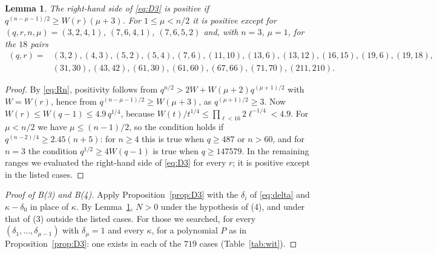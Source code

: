 \documentclass[11pt,a4paper]{amsart}
\newtheorem{lemma}[theorem]{Lemma}
\theoremstyle{remark}
\begin{document}
\begin{lemma}\label{lem:D3pos}
The right-hand side of \eqref{eq:D3} is positive if $q^{(n-\mu-1)/2}\ge W(r)(\mu+3)$. For $1\le\mu<n/2$ it is
positive except for $(q,r,n,\mu)=(3,2,4,1)$, $(7,6,4,1)$, $(7,6,5,2)$ and, with $n=3$, $\mu=1$, for the $18$
pairs
\[
\begin{aligned}
(q,r)={}&(3,2),(4,3),(5,2),(5,4),(7,6),(11,10),(13,6),(13,12),(16,15),(19,6),(19,18),\\
&(31,30),(43,42),(61,30),(61,60),(67,66),(71,70),(211,210).
\end{aligned}
\]
\end{lemma}
\begin{proof}
By \eqref{eq:Rn}, positivity follows from $q^{n/2}>2W+W(\mu+2)q^{(\mu+1)/2}$ with $W=W(r)$, hence from
$q^{(n-\mu-1)/2}\ge W(\mu+3)$, as $q^{(\mu+1)/2}\ge3$. Now $W(r)\le W(q-1)\le4.9\,q^{1/4}$, because
$W(t)/t^{1/4}\le\prod_{\ell<16}2\ell^{-1/4}<4.9$. For $\mu<n/2$ we have $\mu\le(n-1)/2$, so the condition holds
if $q^{(n-2)/4}\ge2.45(n+5)$: for $n\ge4$ this is true when $q\ge487$ or $n>60$, and for $n=3$ the condition
$q^{1/2}\ge4W(q-1)$ is true when $q\ge147579$. In the remaining ranges we evaluated the right-hand side of
\eqref{eq:D3} for every $r$; it is positive except in the listed cases.
\end{proof}

\begin{proof}[Proof of B(3) and B(4)]
Apply Proposition~\ref{prop:D3} with the $\delta_i$ of \eqref{eq:delta} and $\kappa-\delta_0$ in place of
$\kappa$. By Lemma~\ref{lem:D3pos}, $N>0$ under the hypothesis of (4), and under that of (3) outside the listed
cases. For those we searched, for every $(\delta_1,\dots,\delta_{\mu-1})$ with $\delta_\mu=1$ and every $\kappa$,
for a polynomial $P$ as in Proposition~\ref{prop:D3}: one exists in each of the $719$ cases
(Table~\ref{tab:wit}).
\end{proof}
\end{document}
